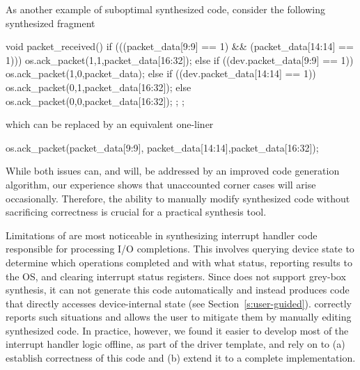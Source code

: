As another example of suboptimal synthesized code, consider the following synthesized fragment

\begin{tsllisting}[frame=single]
void packet_received() {
  if (((packet_data[9:9] == 1) && 
       (packet_data[14:14] == 1))) {
    os.ack_packet(1,1,packet_data[16:32]);
  } else if ((dev.packet_data[9:9] == 1)) {
    os.ack_packet(1,0,packet_data);
  } else if ((dev.packet_data[14:14] == 1)) {
    os.ack_packet(0,1,packet_data[16:32]);
  } else {
    os.ack_packet(0,0,packet_data[16:32]);
  };
};
\end{tsllisting}

which can be replaced by an equivalent one-liner

\begin{tsllisting}[frame=single]
os.ack_packet(packet_data[9:9],
    packet_data[14:14],packet_data[16:32]);
\end{tsllisting}

\noindent While both issues can, and will, be addressed by an improved code generation algorithm, our experience shows that unaccounted corner cases will arise occasionally.  Therefore, the ability to manually modify synthesized code without sacrificing correctness is crucial for a practical synthesis tool.

Limitations of \termite are most noticeable in synthesizing interrupt handler code responsible for processing I/O completions.  This involves querying device state to determine which operations completed and with what status, reporting results to the OS, and clearing interrupt status registers.  Since \termite does not support grey-box synthesis, it can not generate this code automatically and instead produces code that directly accesses device-internal state (see Section~\ref{s:user-guided}).  \termite correctly reports such situations and allows the user to mitigate them by manually editing synthesized code.  In practice, however, we found it easier to develop most of the interrupt handler logic offline, as part of the driver template, and rely on \termite to (a) establish correctness of this code and (b) extend it to a complete implementation.

